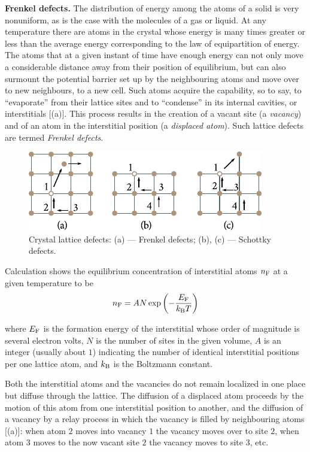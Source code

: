 \textbf{Frenkel defects.} The distribution of energy among the atoms of a solid is very nonuniform, as is the case with the molecules of a gas or liquid. At any temperature there are atoms in the crystal whose energy is many times greater or less than the average energy corresponding to the law of equipartition of energy. The atoms that at a given instant of time have enough energy can not only move a considerable distance away from their position of equilibrium, but can also surmount the potential barrier set up by the neighbouring atoms and move over to new neighbours, to a new cell. Such atoms acquire the capability, so to say, to ``evaporate'' from their lattice sites and to ``condense'' in its internal cavities, or interstitials [(a)]. This process results in the creation of a vacant site (a \textit{vacancy}) and of an atom in the interstitial position (a \textit{displaced atom}). Such lattice defects are termed \textit{Frenkel defects}.

\begin{figure}[t]
	\begin{center}
		\includegraphics[scale=1.1]{figures/ch_01/fig_1_25.pdf}
		\caption[]{Crystal lattice defects: (a) --- Frenkel defects; (b), (c) --- Schottky defects.}
		\label{fig:1_25}
	\end{center}
	\vspace{-0.7cm}
\end{figure}

Calculation shows the equilibrium concentration of interstitial atoms $n_{\text{F}}$ at a given temperature to be
\begin{equation}\label{eq:1_18}
	n_{\text{F}} = A N \exp\left(-\frac{E_{\text{F}}}{k_{\text{B}}T}\right)
\end{equation}

\noindent
where $E_{\text{F}}$ is the formation energy of the interstitial whose order of magnitude is several electron volts, $N$ is the number of sites in the given volume, $A$ is an integer (usually about $1$) indicating the
number of identical interstitial positions per one lattice atom, and $k_{\text{B}}$ is the Boltzmann constant.

Both the interstitial atoms and the vacancies do not remain localized in one place but diffuse through the lattice. The diffusion of a displaced atom proceeds by the motion of this atom from one interstitial position to another, and the diffusion of a vacancy by a relay process in which the vacancy is filled by neighbouring atoms [(a)]: when atom $2$ moves into vacancy $1$ the vacancy moves over to site $2$, when atom $3$ moves to the now vacant site $2$ the vacancy moves to site $3$, etc.

